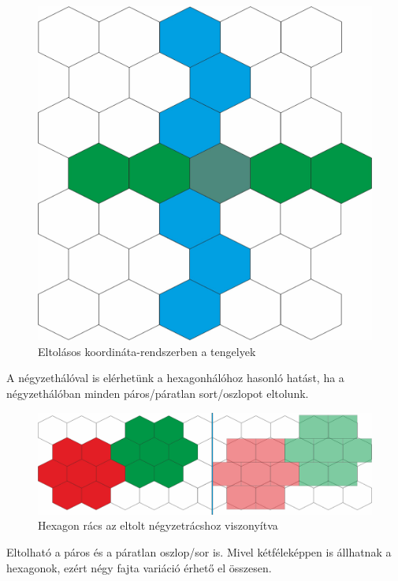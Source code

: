 \begin{figure}[h!]
\centering
\includegraphics[scale=0.2]{kepek/OffsetCoord.jpg}
\caption{Eltolásos koordináta-rendszerben a tengelyek}
\label{fig:OffsetCoord}
\end{figure}

\noindent A négyzethálóval is elérhetünk a hexagonhálóhoz hasonló hatást, ha a négyzethálóban minden páros/páratlan sort/oszlopot eltolunk.

\begin{figure}[h!]
\centering
\includegraphics[scale=0.25]{kepek/Hex_Sq.jpg}
\caption{Hexagon rács az eltolt négyzetrácshoz viszonyítva}
\label{fig:Hex_Sq}
\end{figure}

Eltolható a páros és a páratlan oszlop/sor is. Mivel kétféleképpen is állhatnak a hexagonok, ezért négy fajta variáció érhető el összesen.

